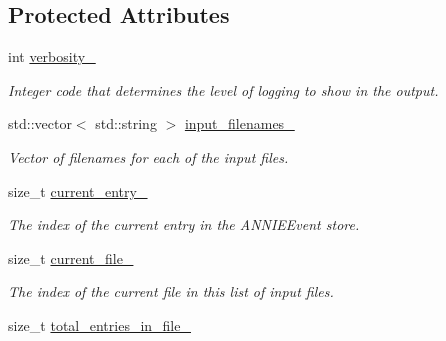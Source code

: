 \subsection*{Protected Attributes}
\begin{DoxyCompactItemize}
\item 
\hypertarget{classLoadANNIEEvent_a1c9892604bb47cb58be2e7b6214ac773}{int \hyperlink{classLoadANNIEEvent_a1c9892604bb47cb58be2e7b6214ac773}{verbosity\-\_\-}}\label{classLoadANNIEEvent_a1c9892604bb47cb58be2e7b6214ac773}

\begin{DoxyCompactList}\small\item\em Integer code that determines the level of logging to show in the output. \end{DoxyCompactList}\item 
\hypertarget{classLoadANNIEEvent_a5de84624994fa2f83892fa7ad192c954}{std\-::vector$<$ std\-::string $>$ \hyperlink{classLoadANNIEEvent_a5de84624994fa2f83892fa7ad192c954}{input\-\_\-filenames\-\_\-}}\label{classLoadANNIEEvent_a5de84624994fa2f83892fa7ad192c954}

\begin{DoxyCompactList}\small\item\em Vector of filenames for each of the input files. \end{DoxyCompactList}\item 
\hypertarget{classLoadANNIEEvent_a9037abdb3ca42bcb45da4f76eaa5497f}{size\-\_\-t \hyperlink{classLoadANNIEEvent_a9037abdb3ca42bcb45da4f76eaa5497f}{current\-\_\-entry\-\_\-}}\label{classLoadANNIEEvent_a9037abdb3ca42bcb45da4f76eaa5497f}

\begin{DoxyCompactList}\small\item\em The index of the current entry in the A\-N\-N\-I\-E\-Event store. \end{DoxyCompactList}\item 
\hypertarget{classLoadANNIEEvent_a92adda94f9be56cfb8a6507aa64d16f6}{size\-\_\-t \hyperlink{classLoadANNIEEvent_a92adda94f9be56cfb8a6507aa64d16f6}{current\-\_\-file\-\_\-}}\label{classLoadANNIEEvent_a92adda94f9be56cfb8a6507aa64d16f6}

\begin{DoxyCompactList}\small\item\em The index of the current file in this list of input files. \end{DoxyCompactList}\item 
\hypertarget{classLoadANNIEEvent_aabbd70eb8db780eb690f58cf76b7178e}{size\-\_\-t \hyperlink{classLoadANNIEEvent_aabbd70eb8db780eb690f58cf76b7178e}{total\-\_\-entries\-\_\-in\-\_\-file\-\_\-}}\label{classLoadANNIEEvent_aabbd70eb8db780eb690f58cf76b7178e}


\end{DoxyCompactItemize}
